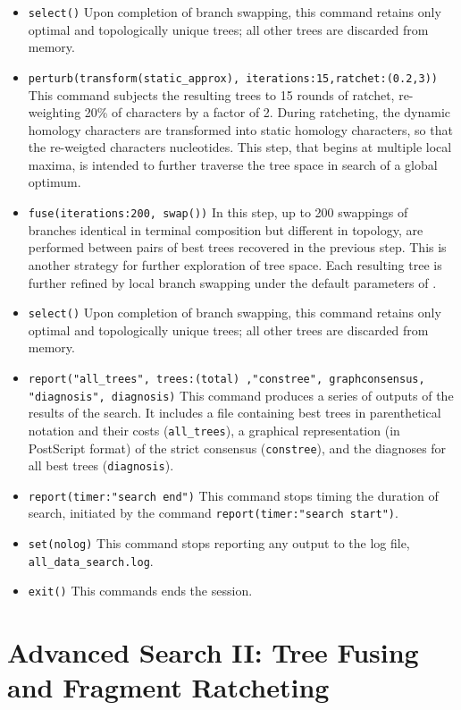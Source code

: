 \begin{itemize}
\item \texttt{select()} Upon completion of branch swapping, this command retains only optimal and topologically unique trees; all other trees are discarded from memory. 
\item \texttt{perturb(transform(static\_approx), iterations:15,ratchet:(0.2,3))} This command subjects the resulting trees to 15 rounds of ratchet, re-weighting 20\% of characters by a factor of 2. During ratcheting, the dynamic homology characters are transformed into static homology characters, so that the re-weigted characters nucleotides. This step, that begins at multiple local maxima, is intended to further traverse the tree space in search of a global optimum.
\item \texttt{fuse(iterations:200, swap())} In this step, up to 200 swappings of branches identical in terminal composition but different in topology, are performed between pairs of best trees recovered in the previous step. This is another strategy for further exploration of tree space. Each resulting tree is further refined by local branch swapping under the default parameters of .
\item \texttt{select()} Upon completion of branch swapping, this command retains only optimal and topologically unique trees; all other trees are discarded from memory.
\item \texttt{report("all\_trees", trees:(total) ,"constree", graphconsensus, "diagnosis", diagnosis)} This command produces a series of outputs of the results of the search. It includes a file containing best trees in parenthetical notation and their costs (\texttt{all\_trees}), a graphical representation (in PostScript format) of the strict consensus (\texttt{constree}), and the diagnoses for all best trees (\texttt{diagnosis}).
\item \texttt{report(timer:"search end")} This command stops timing the duration of search, initiated by the command \texttt{report(timer:"search start")}.
\item \texttt{set(nolog)} This command stops reporting any output to the log file, \texttt{all\_data\_search.log}.
\item \texttt{exit()} This commands ends the \poy session.
\end{itemize}

\section[Fusing and Ratcheting]{Advanced Search II: Tree Fusing and Fragment
Ratcheting}{\label{tutorial3}}


